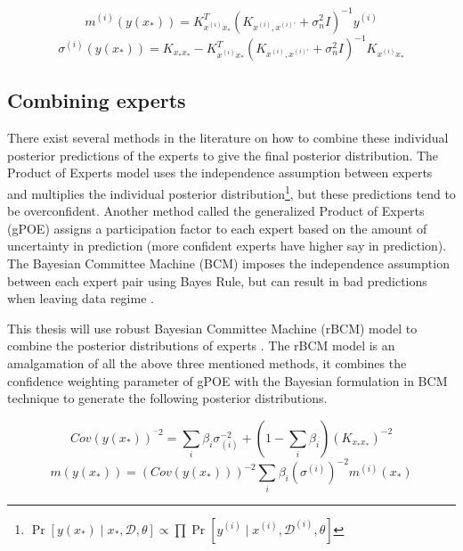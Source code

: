\begin{equation}\label{eqPredictiveMeanIndividualExpert}
  m^{(i)}(y(x_{*})) = K_{x^{(i)}x_{*}}^{T}( K_{x^{(i)}, x^{(i)'}} + \sigma^{2}_{n}I)^{-1}y^{(i)}
  \end{equation}
\begin{equation}\label{eqPredictiveCovarianceIndividualExpert}
	\sigma^{(i)}(y(x_{*})) = K_{x_{*}x_{*}} - K_{x^{(i)}x_{*}}^{T}( K_{x^{(i)}, x^{(i)'}} + \sigma^{2}_{n}I )^{-1} K_{x^{(i)}x_{*}}
  \end{equation}

\subsection{Combining experts}\label{subSecCombiningExperts}
There exist several methods in the literature on how to combine these individual posterior predictions of the experts to give the final posterior distribution. The Product of Experts model uses the independence assumption between experts and multiplies the individual posterior distribution\footnote{$\Pr[y(x_{*}) \mid x_{*}, \mathcal{D}, \theta] \propto \prod \Pr[y^{(i)} \mid x^{(i)}, \mathcal{D}^{(i)}, \theta]$}, but these predictions tend to be overconfident. Another method called the generalized Product of Experts (gPOE) assigns a participation factor to each expert based on the amount of uncertainty in prediction (more confident experts have higher say in prediction)\cite{cao2014generalized}. The Bayesian Committee Machine (BCM) imposes the independence assumption between each expert pair using Bayes Rule, but can result in bad predictions when leaving data regime \cite{tresp2000bayesian}. 

This thesis will use robust Bayesian Committee Machine (rBCM) model to combine the posterior distributions of experts \cite{deisenroth2015distributed}. The rBCM model is an amalgamation of all the above three mentioned methods, it combines the confidence weighting parameter of gPOE with the Bayesian formulation in BCM technique to generate the following posterior distributions.

\begin{equation}\label{eqCovarianceDGP}
    Cov(y(x_{*}))^{^-2} = \sum_{i} \beta_{i}\sigma_{(i)}^{-2} + (1- \sum_{i} \beta_{i})(K_{x_{*}x_{*}})^{-2}
\end{equation}
\begin{equation}\label{eqMeanDGP}
    m(y(x_{*})) = (Cov(y(x_{*})))^{-2}\sum_{i} \beta_{i}(\sigma^{(i)})^{-2}m^{(i)}(x_{*})
\end{equation}

